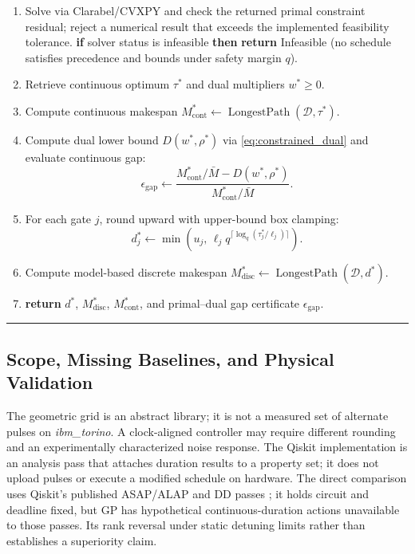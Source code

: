 \documentclass[10pt,letterpaper,journal]{IEEEtran}
\begin{document}
\begin{table}[t]
\begin{enumerate}
\begin{equation*}
\begin{aligned}
& f_i + \tau_j \le f_j, \; \forall (i \to j) \in \mathcal{D}, \quad \tau_i \le f_i \le M,\\
& \ell_j \le \tau_j \le u_j, \quad \forall j.
\end{aligned}
\end{equation*}
\item Solve via Clarabel/CVXPY and check the returned primal constraint residual; reject a numerical result that exceeds the implemented feasibility tolerance. \textbf{if} solver status is infeasible \textbf{then} \textbf{return} Infeasible (no schedule satisfies precedence and bounds under safety margin $q$).
\item Retrieve continuous optimum $\tau^*$ and dual multipliers $w^* \ge 0$.
\item Compute continuous makespan $M_{\mathrm{cont}}^* \gets \operatorname{LongestPath}(\mathcal{D}, \tau^*)$.
\item Compute dual lower bound $D(w^*, \rho^*)$ via \eqref{eq:constrained_dual} and evaluate continuous gap:
\[ \epsilon_{\mathrm{gap}} \gets \frac{M_{\mathrm{cont}}^*/\bar{M} - D(w^*, \rho^*)}{M_{\mathrm{cont}}^*/\bar{M}}. \]
\item For each gate $j$, round upward with upper-bound box clamping:
\[ d_j^* \gets \min\left(u_j, \, \ell_j q^{\lceil \log_q (\tau_j^* / \ell_j) \rceil}\right). \]
\item Compute model-based discrete makespan $M_{\mathrm{disc}}^* \gets \operatorname{LongestPath}(\mathcal{D}, d^*)$.
\item \textbf{return} $d^*$, $M_{\mathrm{disc}}^*$, $M_{\mathrm{cont}}^*$, and primal--dual gap certificate $\epsilon_{\mathrm{gap}}$.
\end{enumerate}
\hrule
\end{table}

\subsection{Scope, Missing Baselines, and Physical Validation}
The geometric grid is an abstract library; it is not a measured set of alternate pulses on \emph{ibm\_torino}. A clock-aligned controller may require different rounding and an experimentally characterized noise response. The Qiskit implementation is an analysis pass that attaches duration results to a property set; it does not upload pulses or execute a modified schedule on hardware. The direct comparison uses Qiskit's published ASAP/ALAP and DD passes \cite{qiskit_sched}; it holds circuit and deadline fixed, but GP has hypothetical continuous-duration actions unavailable to those passes. Its rank reversal under static detuning limits rather than establishes a superiority claim.
\end{document}
